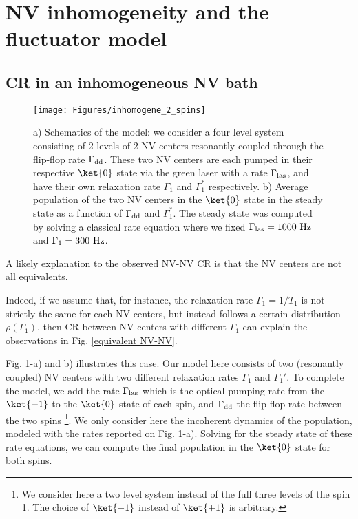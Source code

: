 \documentclass[a4paper,11pt]{report}
\begin{document}
\section{NV inhomogeneity and the fluctuator model}

\subsection{CR in an inhomogeneous NV bath}
\begin{figure}[h]
\centering
\texttt{[image: Figures/inhomogene\_2\_spins]}
\caption{a) Schematics of the model: we consider a four level system consisting of 2 levels of 2 NV centers resonantly coupled through the flip-flop rate $\Gamma_{\rm dd}$. These two NV centers are each pumped in their respective $\ket{0}$ state via the green laser with a rate $\Gamma_{\rm las}$, and have their own relaxation rate $\Gamma_1$ and $\Gamma_1^*$ respectively. b) Average population of the two NV centers in the $\ket{0}$ state in the steady state as a function of $\Gamma_{\rm dd}$ and $\Gamma_1^*$. The steady state was computed by solving a classical rate equation where we fixed $\Gamma_{\rm las}=1000\ \rm Hz$ and $\Gamma_1=300\ \rm Hz$.}
\label{inhomogene}
\end{figure}
A likely explanation to the observed NV-NV CR is that the NV centers are not all equivalents.

Indeed, if we assume that, for instance, the relaxation rate $\Gamma_1=1/T_1$ is not strictly the same for each NV centers, but instead follows a certain distribution $\rho(\Gamma_1)$, then CR between NV centers with different $\Gamma_1$ can explain the observations in Fig. \ref{equivalent NV-NV}.

Fig. \ref{inhomogene}-a) and b) illustrates this case. Our model here consists of two (resonantly coupled) NV centers with two different relaxation rates $\Gamma_1$ and $\Gamma_1'$. To complete the model, we add the rate $\Gamma_{\rm las}$ which is the optical pumping rate from the $\ket{-1}$ to the $\ket{0}$ state of each spin, and $\Gamma_{\rm dd}$ the flip-flop rate between the two spins \footnote{We consider here a two level system instead of the full three levels of the spin 1. The choice of $\ket{-1}$ instead of $\ket{+1}$ is arbitrary.}. We only consider here the incoherent dynamics of the population, modeled with the rates reported on Fig. \ref{inhomogene}-a). Solving for the steady state of these rate equations, we can compute the final population in the $\ket{0}$ state for both spins. 
\end{document}
